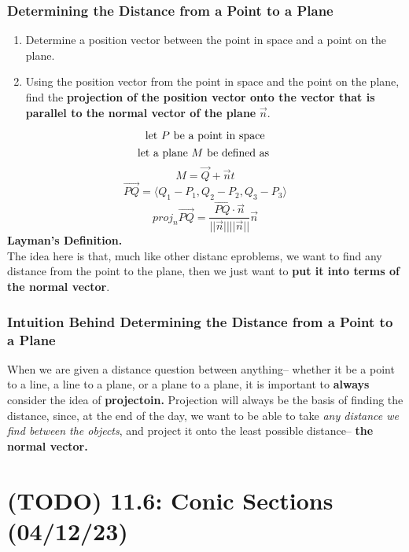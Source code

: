 \documentclass{report}
\begin{document}
\begin{sloppypar}
\subsection{Determining the Distance from a Point to a Plane}
\begin{center}
      {\begin{enumerate}
        \item Determine a position vector between the
              point in space and a point on the plane.
        \item Using the position vector from the
              point in space and the point on the plane,
              find the \textbf{projection of the position
              vector onto the vector that is parallel
              to the normal vector of the plane } $ \vec{n}$.
      \end{enumerate}
      \[ \textrm{let $ P$ be a point in space}\]
      \[ \textrm{let a plane $ M $ be defined as }\]
      \[ M = \vec{Q} + \vec{n} t \]
      \[ \overrightarrow{PQ} = \langle Q_{1} - P_{1}, Q_{2} - P_{2}, Q_{3} - P_{3} \rangle\]
      \[ proj_{n}\overrightarrow{PQ} = \frac{\overrightarrow{PQ} \cdot \vec{n} }{||\vec{n}|| ||\vec{n}||} \vec{n}   \]
      \textbf{Layman's Definition.} \\
      The idea here is that, much like
      other distanc eproblems, we
      want to find any distance from the
      point to the plane, then we just want to
      \textbf{put it into terms of the normal vector}.
    }
\end{center}


\subsection{Intuition Behind Determining the Distance from a Point to a Plane}
When we are given a distance question between anything--
whether it be a point to a line, a line to a plane,
or a plane to a plane, it is important to \textbf{always}
consider the idea of \textbf{projectoin.} Projection
will always be the basis of finding the distance,
since, at the end of the day, we want to be able to
take \textit{any distance we find between the objects},
and project it onto the least possible distance--
\textbf{the normal vector.}




\chapter{(TODO) 11.6: Conic Sections (04/12/23)}

\end{sloppypar}
\end{document}
